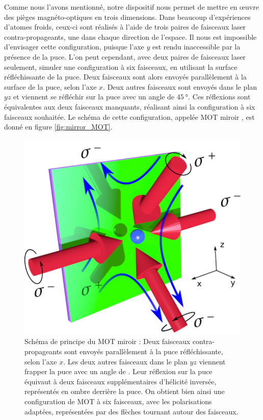 \clearpage
Comme nous l'avons mentionné, notre dispositif nous permet de mettre en \oe uvre des pièges magnéto-optiques en trois dimensions.
Dans beaucoup d'expériences d'atomes froids, ceux-ci sont réalisés à l'aide de trois paires de faisceaux laser contra-propageants, une dans chaque direction de l'espace.
Il nous est impossible d'envisager cette configuration, puisque l'axe $y$ est rendu inaccessible par la présence de la puce.
L'on peut cependant, avec deux paires de faisceaux laser seulement, simuler une configuration à six faisceaux, en utilisant la surface réfléchissante de la puce.
Deux faisceaux sont alors envoyés parallèlement à la surface de la puce, selon l'axe $x$.
Deux autres faisceaux sont envoyés dans le plan $yz$ et viennent se réfléchir sur la puce avec un angle de $\SI{45}{\degree}$.
Ces réflexions sont équivalentes aux deux faisceaux manquants, réalisant ainsi la configuration à six faisceaux souhaitée.
Le schéma de cette configuration, appelée \og MOT miroir \fg{}, est donné en figure \eqref{fig:mirror_MOT}.

\begin{figure}[h]
\centering
\includegraphics[width=0.6\linewidth]{figures/setup/coldatoms/mirror_MOT}
\caption[Schéma de principe du MOT miroir]{Schéma de principe du MOT miroir :
Deux faisceaux contra-propageants sont envoyés parallèlement à la puce réfléchissante, selon l'axe $x$.
Les deux autres faisceaux dans le plan $yz$ viennent frapper la puce avec un angle de .
Leur réflexion sur la puce équivaut à deux faisceaux supplémentaires d'hélicité inversée, représentés en ombre derrière la puce.
On obtient bien ainsi une configuration de MOT à six faisceaux, avec les polarisations adaptées, représentées par des flèches tournant autour des faisceaux.
}
\label{fig:mirror_MOT}
\end{figure}


